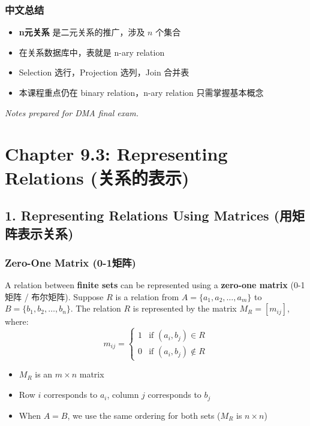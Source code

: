 \documentclass[10pt,a4paper,openany]{ctexbook}
\theoremstyle{definition}
\theoremstyle{remark}
\begin{document}
\subsubsection{中文总结}

\begin{itemize}
\item \textbf{n元关系} 是二元关系的推广，涉及 $n$ 个集合
\item 在关系数据库中，表就是 n-ary relation
\item Selection 选行，Projection 选列，Join 合并表
\item 本课程重点仍在 binary relation，n-ary relation 只需掌握基本概念

\end{itemize}

\vspace{-2pt}

\textit{Notes prepared for DMA final exam.}


\section{Chapter 9.3: Representing Relations (关系的表示)}

\vspace{-2pt}

\subsection{1. Representing Relations Using Matrices (用矩阵表示关系)}

\subsubsection{Zero-One Matrix (0-1矩阵)}

A relation between \textbf{finite sets} can be represented using a \textbf{zero-one matrix} (0-1矩阵 / 布尔矩阵).
Suppose $R$ is a relation from $A = \{a_1, a_2, \dots, a_m\}$ to $B = \{b_1, b_2, \dots, b_n\}$.
The relation $R$ is represented by the matrix $M_R = [m_{ij}]$, where:
\[
m_{ij} = \begin{cases}
1 & \text{if } (a_i, b_j) \in R \\
0 & \text{if } (a_i, b_j) \notin R
\end{cases}
\]

\begin{itemize}
\item $M_R$ is an $m \times n$ matrix
\item Row $i$ corresponds to $a_i$, column $j$ corresponds to $b_j$
\item When $A = B$, we use the same ordering for both sets ($M_R$ is $n \times n$)

\end{itemize}
\end{document}
